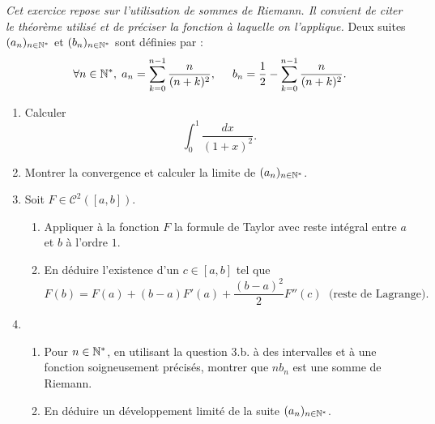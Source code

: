 \emph{Cet exercice repose sur l'utilisation de sommes de Riemann. Il convient de citer le théorème utilisé et de préciser la fonction à laquelle on l'applique.}\newline
Deux suites $(a_{n})_{n\in \mathbb{N}^*}$ et $(b_{n})_{n\in \mathbb{N}^*}$ sont d{\'e}finies par :
\[
\forall n \in \mathbb{N}^*, \;
a_{n} = \sum_{k = 0}^{n - 1}\frac{n}{(n+k)^{2}}, \hspace{0.5cm}
b_{n} = \frac{1}{2} - \sum_{k = 0}^{n - 1}\frac{n}{(n + k)^{2}}.
\]

\begin{enumerate}
 \item Calculer 
\[
 \int_{0}^{1}\frac{dx}{(1+x)^2}.
\]

\item  Montrer la convergence et calculer la limite de $(a_{n})_{n\in \mathbb{N}^*}$.

\item Soit $F\in \mathcal{C}^2(\left[ a,b\right])$. 
\begin{enumerate}
 \item Appliquer à la fonction $F$ la formule de Taylor avec reste intégral entre $a$ et $b$ à l'ordre $1$. 
 \item En déduire l'existence d'un $c\in \left[ a,b \right]$ tel que 
\[
 F(b) = F(a) + (b-a)F'(a) + \frac{(b-a)^2}{2}F''(c) \;\text{ (reste de Lagrange)}.
\]
\end{enumerate}

\item  
\begin{enumerate}
 \item Pour $n \in \mathbb{N}^*$, en utilisant la question 3.b. à des intervalles et à une fonction soigneusement précisés, montrer que $nb_n$ est une somme de Riemann.
 \item En déduire un développement limité de la suite $(a_{n})_{n\in \mathbb{N}^*}$. 
\end{enumerate}
\end{enumerate}